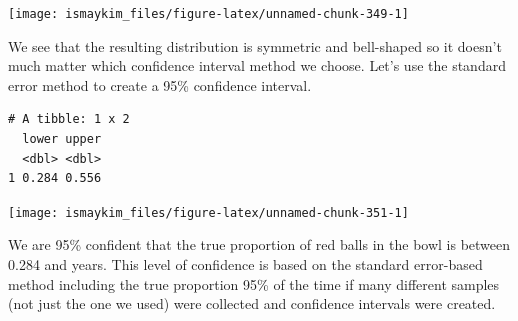 \documentclass[12pt,]{krantz}
\makeatletter
\newenvironment{Shaded}{\begin{snugshade}}{\end{snugshade}}
\newcommand{\KeywordTok}[1]{\textcolor[rgb]{0.27,0.27,0.27}{\textbf{#1}}}
\newcommand{\DataTypeTok}[1]{\textcolor[rgb]{0.27,0.27,0.27}{#1}}
\newcommand{\DecValTok}[1]{\textcolor[rgb]{0.06,0.06,0.06}{#1}}
\newcommand{\FloatTok}[1]{\textcolor[rgb]{0.06,0.06,0.06}{#1}}
\newcommand{\StringTok}[1]{\textcolor[rgb]{0.5,0.5,0.5}{#1}}
\newcommand{\OperatorTok}[1]{\textcolor[rgb]{0.43,0.43,0.43}{\textbf{#1}}}
\newcommand{\NormalTok}[1]{#1}
\newenvironment{kframe}{%
\medskip{}
\setlength{\fboxsep}{.8em}
 \def\at@end@of@kframe{}%
 \ifinner\ifhmode%
  \def\at@end@of@kframe{\end{minipage}}%
  \begin{minipage}{\columnwidth}%
 \fi\fi%
 \def\FrameCommand##1{\hskip\@totalleftmargin \hskip-\fboxsep
 \colorbox{shadecolor}{##1}\hskip-\fboxsep
     \hskip-\linewidth \hskip-\@totalleftmargin \hskip\columnwidth}%
 \MakeFramed {\advance\hsize-\width
   \@totalleftmargin\z@ \linewidth\hsize
   \@setminipage}}%
 {\par\unskip\endMakeFramed%
 \at@end@of@kframe}
\renewenvironment{Shaded}{\begin{kframe}}{\end{kframe}}
\theoremstyle{definition}
\theoremstyle{definition}
\theoremstyle{definition}
\theoremstyle{remark}
\makeatother
\begin{document}
\begin{Shaded}
\end{Shaded}

\begin{center}\texttt{[image: ismaykim\_files/figure-latex/unnamed-chunk-349-1]} \end{center}

We see that the resulting distribution is symmetric and bell-shaped so
it doesn't much matter which confidence interval method we choose. Let's
use the standard error method to create a 95\% confidence interval.

\begin{Shaded}
\end{Shaded}

\begin{verbatim}
# A tibble: 1 x 2
  lower upper
  <dbl> <dbl>
1 0.284 0.556
\end{verbatim}

\begin{Shaded}
\end{Shaded}

\begin{center}\texttt{[image: ismaykim\_files/figure-latex/unnamed-chunk-351-1]} \end{center}

We are 95\% confident that the true proportion of red balls in the bowl
is between 0.284 and years. This level of confidence is based on the
standard error-based method including the true proportion 95\% of the
time if many different samples (not just the one we used) were collected
and confidence intervals were created.
\end{document}

